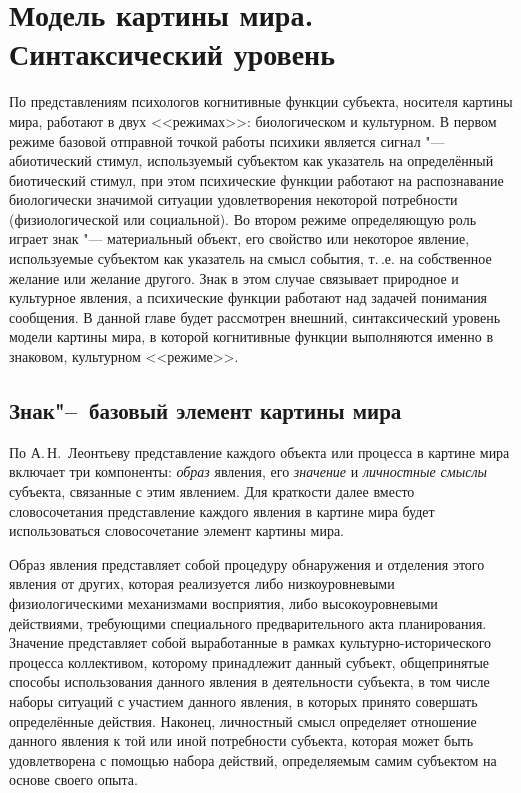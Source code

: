 \chapter{Модель картины мира. Синтаксический уровень} \label{chapt2}

По представлениям психологов \cite{Chudova2012a,Chudova2014} когнитивные функции субъекта, носителя картины мира, работают в двух <<режимах>>: биологическом и культурном. В первом режиме базовой отправной точкой работы психики является сигнал "--- абиотический стимул, используемый субъектом как указатель на определённый биотический стимул, при этом психические функции работают на распознавание биологически значимой ситуации удовлетворения некоторой потребности (физиологической или социальной). Во втором режиме определяющую роль играет знак "--- материальный объект, его свойство или некоторое явление, используемые субъектом как указатель на смысл события, т.\,.е. на собственное желание или желание другого. Знак в этом случае связывает природное и культурное явления, а психические функции работают над задачей понимания сообщения. В данной главе будет рассмотрен внешний, синтаксический уровень модели картины мира, в которой когнитивные функции выполняются именно в знаковом, культурном <<режиме>>.

\section{Знак"--~базовый элемент картины мира} \label{sect2_1}

По А.\,Н.~Леонтьеву \cite{Leontiev1975} представление каждого объекта или процесса в картине мира включает три компоненты: \textit{образ} явления, его \textit{значение} и \textit{личностные смыслы} субъекта, связанные с этим явлением. Для краткости далее вместо словосочетания представление каждого явления в картине мира будет использоваться словосочетание элемент картины мира.

Образ явления представляет собой процедуру обнаружения и отделения этого явления от других, которая реализуется либо низкоуровневыми физиологическими механизмами восприятия, либо высокоуровневыми действиями, требующими специального предварительного акта планирования. Значение представляет собой выработанные в рамках культурно-исторического процесса коллективом, которому принадлежит данный субъект, общепринятые способы использования данного явления в деятельности субъекта, в том числе наборы ситуаций с участием данного явления, в которых принято совершать определённые действия. Наконец, личностный смысл определяет отношение данного явления к той или иной потребности субъекта, которая может быть удовлетворена с помощью набора действий, определяемым самим субъектом на основе своего опыта.


